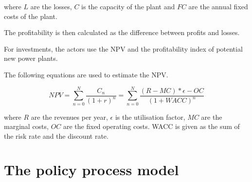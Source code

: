 where $L$ are the losses, $C$ is the capacity of the plant and $FC$ are the annual fixed costs of the plant.

The profitability is then calculated as the difference between profits and losses.

For investments, the actors use the NPV and the profitability index of potential new power plants. 

The following equations are used to estimate the NPV.

\begin{equation}
NPV = \sum_{n=0}^N \frac{C_n}{(1+r)^n} = \sum_{n=0}^{N} \frac{(R-MC)*\epsilon-OC}{(1+WACC)^n}
\end{equation}

where $R$ are the revenues per year, $\epsilon$ is the utilisation factor, $MC$ are the marginal costs, $OC$ are the fixed operating costs. WACC is given as the sum of the risk rate and the discount rate.


\section{The policy process model}
\label{sec:ImplementationPolicy}

